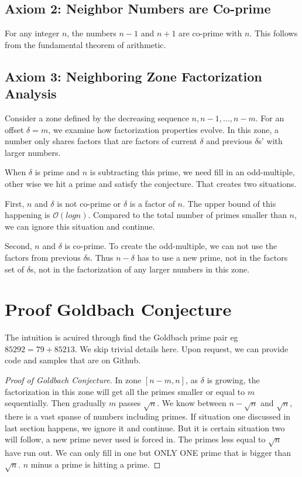 \documentclass[12pt]{article}
\theoremstyle{definition}
\begin{document}
\subsection*{Axiom 2: Neighbor Numbers are Co-prime}
For any integer \( n \), the numbers \( n - 1 \) and \( n + 1 \) are co-prime with \( n \). This follows from the fundamental theorem of arithmetic.

\subsection*{Axiom 3: Neighboring Zone Factorization Analysis}
Consider a zone defined by the decreasing sequence \( n, n - 1, \dots, n - m \). For an offset \( \delta = m \), we examine how factorization properties evolve. In this zone, a number only shares factors that are factors of current $\delta $ and previous $\delta$s' with larger numbers.
\bigskip

When $\delta $ is prime and $n$ is subtracting this prime, we need fill in an odd-multiple, other wise we hit a prime and satisfy the conjecture. That creates two situations. 
\bigskip

First, $n$ and $\delta$ is not co-prime or $\delta$ is a factor of $n$. The upper bound of this happening is $\mathcal{O}(log n)$. Compared to the total number of primes smaller than $n$, we can ignore this situation and continue.
\bigskip

Second, $n$ and $\delta$ is co-prime. To create the odd-multiple, we can not use the factors from previous $\delta $s. Thus $n - \delta $ has to use a new prime, not in the factors set of $\delta$s, not in the factorization of any larger numbers in this zone.
\bigskip

\section{Proof Goldbach Conjecture}
The intuition is acuired through find the Goldbach prime pair eg \( 85292  = 79 + 85213 \). We skip trivial details here. Upon request, we can provide code and samples that are on Github.
\begin{proof}[Proof of Goldbach Conjecture]
In zone $[n-m,n]$, as $\delta$ is growing, the factorization in this zone will get all the primes smaller or equal to $m$ sequentially. Then gradually $m$ passes $\sqrt n$. We know between $n - \sqrt n$ and $\sqrt n$, there is a vast spanse of numbers including primes. If situation one discussed in last section happens, we ignore it and continue. But it is certain situation two will follow, a new prime never used is forced in. The primes less equal to $\sqrt n$ have run out. We can only fill in one but ONLY ONE prime that is bigger than $\sqrt n$. $n$ minus a prime is hitting a prime.
\end{proof}
\end{document}

